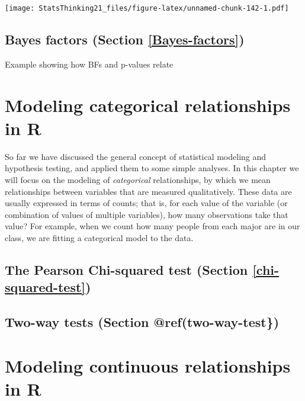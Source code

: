 \documentclass[12pt,]{book}
\begin{document}
\texttt{[image: StatsThinking21\_files/figure-latex/unnamed-chunk-142-1.pdf]}

\hypertarget{bayes-factors-section-refbayes-factors}{%
\section{Bayes factors (Section \ref{Bayes-factors})}\label{bayes-factors-section-refbayes-factors}}

Example showing how BFs and p-values relate

\hypertarget{modeling-categorical-relationships-in-r}{%
\chapter{Modeling categorical relationships in R}\label{modeling-categorical-relationships-in-r}}

So far we have discussed the general concept of statistical modeling and hypothesis testing, and applied them to some simple analyses. In this chapter we will focus on the modeling of \emph{categorical} relationships, by which we mean relationships between variables that are measured qualitatively. These data are usually expressed in terms of counts; that is, for each value of the variable (or combination of values of multiple variables), how many observations take that value? For example, when we count how many people from each major are in our class, we are fitting a categorical model to the data.

\hypertarget{the-pearson-chi-squared-test-section-refchi-squared-test}{%
\section{The Pearson Chi-squared test (Section \ref{chi-squared-test})}\label{the-pearson-chi-squared-test-section-refchi-squared-test}}

\hypertarget{two-way-tests-section-reftwo-way-test}{%
\section{Two-way tests (Section @ref(two-way-test\})}\label{two-way-tests-section-reftwo-way-test}}

\hypertarget{modeling-continuous-relationships-in-r}{%
\chapter{Modeling continuous relationships in R}\label{modeling-continuous-relationships-in-r}}
\end{document}
